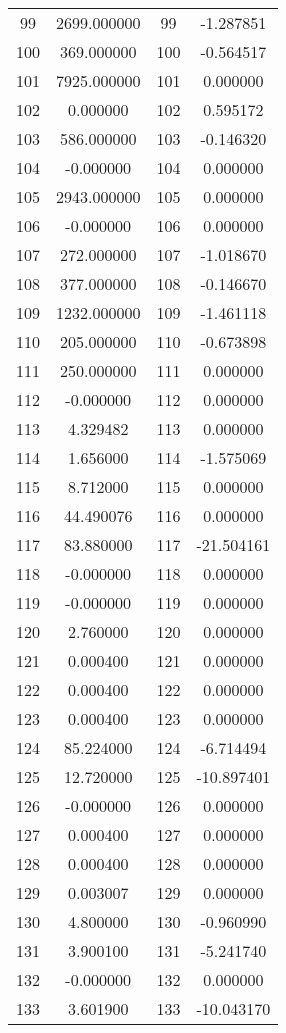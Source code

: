 \documentclass[12pt]{article}
\begin{document}
\begin{longtable}{@{}cccc@{}}
99 & 2699.000000 & 99 & -1.287851 \\
100 & 369.000000 & 100 & -0.564517 \\
101 & 7925.000000 & 101 & 0.000000 \\
102 & 0.000000 & 102 & 0.595172 \\
103 & 586.000000 & 103 & -0.146320 \\
104 & -0.000000 & 104 & 0.000000 \\
105 & 2943.000000 & 105 & 0.000000 \\
106 & -0.000000 & 106 & 0.000000 \\
107 & 272.000000 & 107 & -1.018670 \\
108 & 377.000000 & 108 & -0.146670 \\
109 & 1232.000000 & 109 & -1.461118 \\
110 & 205.000000 & 110 & -0.673898 \\
111 & 250.000000 & 111 & 0.000000 \\
112 & -0.000000 & 112 & 0.000000 \\
113 & 4.329482 & 113 & 0.000000 \\
114 & 1.656000 & 114 & -1.575069 \\
115 & 8.712000 & 115 & 0.000000 \\
116 & 44.490076 & 116 & 0.000000 \\
117 & 83.880000 & 117 & -21.504161 \\
118 & -0.000000 & 118 & 0.000000 \\
119 & -0.000000 & 119 & 0.000000 \\
120 & 2.760000 & 120 & 0.000000 \\
121 & 0.000400 & 121 & 0.000000 \\
122 & 0.000400 & 122 & 0.000000 \\
123 & 0.000400 & 123 & 0.000000 \\
124 & 85.224000 & 124 & -6.714494 \\
125 & 12.720000 & 125 & -10.897401 \\
126 & -0.000000 & 126 & 0.000000 \\
127 & 0.000400 & 127 & 0.000000 \\
128 & 0.000400 & 128 & 0.000000 \\
129 & 0.003007 & 129 & 0.000000 \\
130 & 4.800000 & 130 & -0.960990 \\
131 & 3.900100 & 131 & -5.241740 \\
132 & -0.000000 & 132 & 0.000000 \\
133 & 3.601900 & 133 & -10.043170 \\

\end{longtable}
\end{document}
